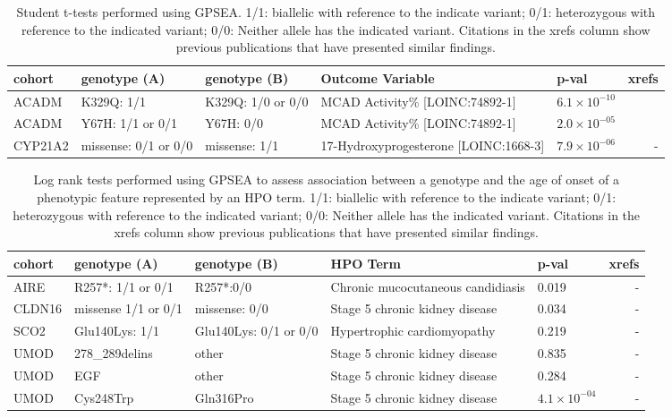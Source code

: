 \begin{table}
\centering
\begin{tabular}{lp{2cm}p{2cm}>{\raggedright}p{4.5cm}lr}
\toprule
\textbf{cohort} & \textbf{genotype (A)} & \textbf{genotype (B)} & \textbf{Outcome Variable} & \textbf{p-val} & \textbf{xrefs}\\
\midrule
ACADM & K329Q: 1/1 & K329Q: 1/0 or 0/0 & MCAD Activity\% [LOINC:74892-1] & $6.1 \times 10^{-10}$ & \cite{PMID_33580884}\\
ACADM & Y67H: 1/1 or 0/1  & Y67H: 0/0 & MCAD Activity\% [LOINC:74892-1] & $2.0 \times 10^{-05}$ & \cite{PMID_33580884}\\
CYP21A2 & missense: 0/1 or 0/0 & missense: 1/1 & 17-Hydroxyprogesterone [LOINC:1668-3] & $7.9 \times 10^{-06}$ & -\\
\bottomrule
\end{tabular}
\caption{Student t-tests performed using GPSEA. 1/1: biallelic with reference to the indicate variant; 0/1: heterozygous with reference to the indicated variant; 0/0: Neither allele has the indicated variant.
Citations in the xrefs column show previous publications that have presented similar findings.}
\label{tab:t_test}
\end{table}

\clearpage
\newpage


\begin{table}
\centering
\begin{tabular}{lp{2cm}p{2cm}>{\raggedright}p{4.5cm}lr}
\toprule
\textbf{cohort} & \textbf{genotype (A)} & \textbf{genotype (B)} & \textbf{HPO Term} & \textbf{p-val} & \textbf{xrefs}\\
\midrule
AIRE & R257*: 1/1 or 0/1 & R257*:0/0 & Chronic mucocutaneous candidiasis & 0.019 & -\\
CLDN16 & missense 1/1 or 0/1 & missense: 0/0 & Stage 5 chronic kidney disease & 0.034 & -\\
SCO2 & Glu140Lys: 1/1 & Glu140Lys: 0/1 or 0/0 & Hypertrophic cardiomyopathy & 0.219 & -\\
UMOD & 278\_289delins & other & Stage 5 chronic kidney disease & 0.835 & -\\
UMOD & EGF & other & Stage 5 chronic kidney disease & 0.284 & -\\
UMOD & Cys248Trp & Gln316Pro & Stage 5 chronic kidney disease & $4.1 \times 10^{-04}$ & -\\
\bottomrule
\end{tabular}
\caption{Log rank tests performed using GPSEA to assess association between a genotype and the age of
    onset of a phenotypic feature represented by an HPO term. 1/1: biallelic with reference to the indicate variant; 
    0/1: heterozygous with reference to the indicated variant; 0/0: Neither allele has the indicated variant.
    Citations in the xrefs column show previous publications that have presented similar findings.}
\label{tab:to_do}
\end{table}
\clearpage
\newpage



